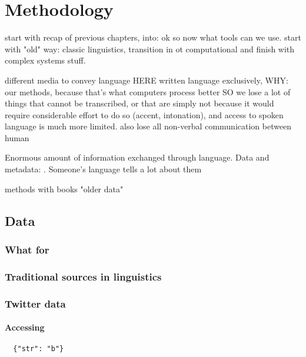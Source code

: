 \documentclass[../thesis.tex]{subfiles}
\begin{document}
\chapter{Methodology}
\label{ch:methods}

start with recap of previous chapters, into: ok so now what tools can we use. start with "old" way: classic linguistics, transition in ot computational and finish with complex systems stuff.
\cite{NguyenComputationalSociolinguistics2016}

different media to convey language
HERE written language exclusively, WHY: our methods, because that's what computers process better
SO we lose a lot of things that cannot be transcribed, or that are simply not because it would require considerable effort to do so  (accent, intonation), and access to spoken language is much more limited. also lose all non-verbal communication between human


Enormous amount of information exchanged through language. Data and metadata: . Someone's language tells a lot about them

methods with books "older data"


\section{Data}

\subsection{What for}

\subsection{Traditional sources in linguistics}

\subsection{Twitter data}

\subsubsection{Accessing}

\begin{verbatim}
  {"str": "b"}
\end{verbatim}
\end{document}
